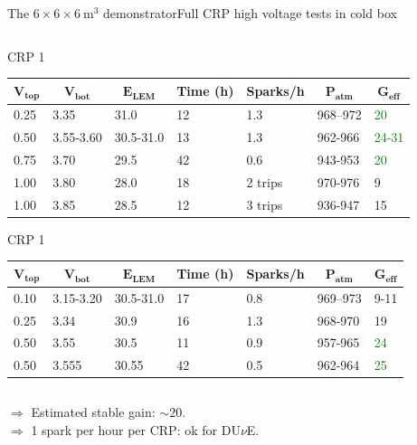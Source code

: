 \documentclass[10pt]{beamer}
\begin{document}
\begin{frame}{The \texorpdfstring{$6 \times 6 \times \SI{6}{\meter\cubed}$}{666} demonstrator}{Full CRP high voltage  tests in cold box}
\begin{columns}
\begin{column}{0.65\textwidth}
\begin{tiny}
\begin{table}[]
\begin{scriptsize}
    						\centering CRP 1
    					\end{scriptsize}
    					\begin{tabular}{|l|l|l|l|l|l|l|}
    						\hline
    						\multicolumn{1}{|c|}{\textbf{$\mathbf{V_{top}}$}} & \multicolumn{1}{c|}{\textbf{$\mathbf{V_{bot}}$}} & \multicolumn{1}{c|}{\textbf{$\mathbf{E_{LEM}}$}} & \multicolumn{1}{c|}{\textbf{Time (h)}} & \multicolumn{1}{c|}{\textbf{Sparks/h}} & \multicolumn{1}{c|}{\textbf{$\mathbf{P_{atm}}$}} & \multicolumn{1}{c|}{\textbf{$\mathbf{G_{eff}}$}} \\ \hline
    						0.25 & 3.35 & 31.0 & 12 & 1.3 & 968--972 & \textcolor{green}{20} \\
    						0.50 & 3.55-3.60 & 30.5-31.0 & 13 & 1.3 & 962-966 & \textcolor{green}{24-31} \\
    						0.75 & 3.70 & 29.5 & 42 & 0.6 & 943-953 & \textcolor{green}{20} \\
    						1.00 & 3.80 & 28.0 & 18 & 2 trips & 970-976 & 9 \\
    						1.00 & 3.85 & 28.5 & 12 & 3 trips & 936-947 & 15 \\ \hline
    					\end{tabular}
    				\end{table}
    				\begin{table}[]
    					\begin{scriptsize}
    						\centering CRP 1
    					\end{scriptsize}
    					\begin{tabular}{|l|l|l|l|l|l|l|}
    						\hline
    						\multicolumn{1}{|c|}{\textbf{$\mathbf{V_{top}}$}} & \multicolumn{1}{c|}{\textbf{$\mathbf{V_{bot}}$}} & \multicolumn{1}{c|}{\textbf{$\mathbf{E_{LEM}}$}} & \multicolumn{1}{c|}{\textbf{Time (h)}} & \multicolumn{1}{c|}{\textbf{Sparks/h}} & \multicolumn{1}{c|}{\textbf{$\mathbf{P_{atm}}$}} & \multicolumn{1}{c|}{\textbf{$\mathbf{G_{eff}}$}} \\ \hline
    						0.10 & 3.15-3.20 & 30.5-31.0 & 17 & 0.8 & 969--973 & 9-11 \\
    						0.25 & 3.34 & 30.9 & 16 & 1.3 & 968-970 & 19 \\
    						0.50 & 3.55 & 30.5 & 11 & 0.9 & 957-965 & \textcolor{green}{24} \\
    						0.50 & 3.555 & 30.55 & 42 & 0.5 & 962-964 & \textcolor{green}{25} \\ \hline
    					\end{tabular}
    				\end{table}
    			\end{tiny}
    		\end{column}
    	\end{columns}
    	\vfill
    	\begin{scriptsize}
	    	$\Rightarrow$ Estimated stable gain: $\sim20$.\\
	    	$\Rightarrow$ 1 spark per hour per CRP: ok for DU$\nu$E.
	    \end{scriptsize}
	    \end{frame}
       
\end{document}
